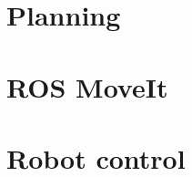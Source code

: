 \section{Planning}
\label{sec:planning}
\section{ROS MoveIt}
\section{Robot control}
\label{sec:robot_control}

%
